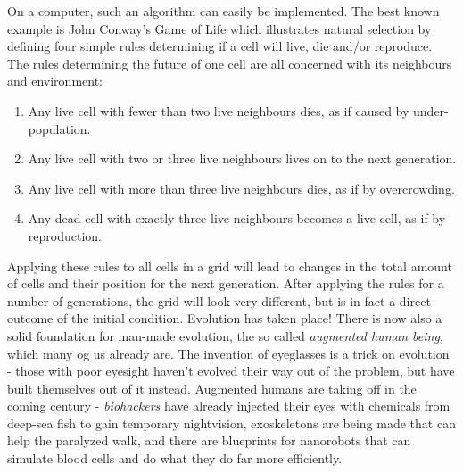 On a computer, such an algorithm can easily be implemented.
The best known example is John Conway's Game of Life \cite{Conway} which illustrates natural selection by defining four simple rules determining if a cell will live, die and/or reproduce.
The rules determining the future of one cell are all concerned with its neighbours and environment:
\begin{enumerate}
\item Any live cell with fewer than two live neighbours dies, as if caused by under-population.
\item Any live cell with two or three live neighbours lives on to the next generation.
\item Any live cell with more than three live neighbours dies, as if by overcrowding.
\item Any dead cell with exactly three live neighbours becomes a live cell, as if by reproduction.
\end{enumerate}
Applying these rules to all cells in a grid will lead to changes in the total amount of cells and their position for the next generation.
After applying the rules for a number of generations, the grid will look very different, but is in fact a direct outcome of the initial condition.
Evolution has taken place! 
There is now also a solid foundation for man-made evolution, the so called \emph{augmented human being}, which many og us already are. The invention of eyeglasses is a trick on evolution - those with poor eyesight haven't evolved their way out of the problem, but have built themselves out of it instead. Augmented humans are taking off in the coming century - \emph{biohackers} have already injected their eyes with chemicals from deep-sea fish to gain temporary nightvision\cite{biohack}, exoskeletons are being made that can help the paralyzed walk, and there are blueprints for nanorobots that can simulate blood cells and do what they do far more efficiently\cite{nanoblood}. 

